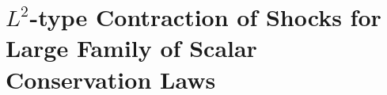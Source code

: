 \chapter{$L^2$-type Contraction of Shocks for Large Family of Scalar Conservation Laws} \label{ch:conservation}

%
%
